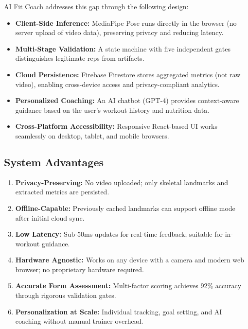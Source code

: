 \documentclass[12pt,a4paper]{article}
\begin{document}
AI Fit Coach addresses this gap through the following design:

\begin{itemize}[noitemsep, topsep=2pt]
  \item \textbf{Client-Side Inference:} MediaPipe Pose runs directly in the 
        browser (no server upload of video data), preserving privacy and reducing 
        latency.
  
  \item \textbf{Multi-Stage Validation:} A state machine with five independent 
        gates distinguishes legitimate reps from artifacts.
  
  \item \textbf{Cloud Persistence:} Firebase Firestore stores aggregated metrics 
        (not raw video), enabling cross-device access and privacy-compliant 
        analytics.
  
  \item \textbf{Personalized Coaching:} An AI chatbot (GPT-4) provides context-aware 
        guidance based on the user's workout history and nutrition data.
  
  \item \textbf{Cross-Platform Accessibility:} Responsive React-based UI works 
        seamlessly on desktop, tablet, and mobile browsers.
\end{itemize}

\subsection{System Advantages}

\begin{enumerate}[noitemsep, topsep=2pt]
  \item \textbf{Privacy-Preserving:} No video uploaded; only skeletal landmarks 
        and extracted metrics are persisted.
  
  \item \textbf{Offline-Capable:} Previously cached landmarks can support offline 
        mode after initial cloud sync.
  
  \item \textbf{Low Latency:} Sub-50ms updates for real-time feedback; suitable 
        for in-workout guidance.
  
  \item \textbf{Hardware Agnostic:} Works on any device with a camera and modern 
        web browser; no proprietary hardware required.
  
  \item \textbf{Accurate Form Assessment:} Multi-factor scoring achieves 92\% 
        accuracy through rigorous validation gates.
  
  \item \textbf{Personalization at Scale:} Individual tracking, goal setting, 
        and AI coaching without manual trainer overhead.
\end{enumerate}
\end{document}

